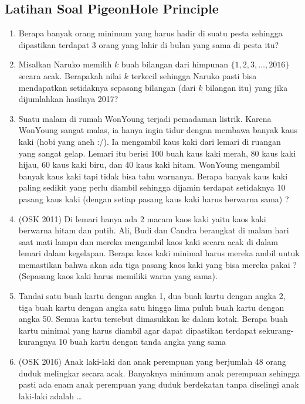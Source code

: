 \subsection{Latihan Soal PigeonHole Principle}
\begin{enumerate}
\item Berapa banyak orang minimum yang harus hadir di suatu pesta sehingga dipastikan terdapat 3 orang yang lahir di bulan yang sama di pesta itu?

\item Misalkan Naruko memilih $k$ buah bilangan dari himpunan $\{1,2,3,\dots,2016\}$ secara acak. Berapakah nilai $k$ terkecil sehingga Naruko pasti bisa mendapatkan setidaknya sepasang bilangan (dari $k$ bilangan itu) yang jika dijumlahkan hasilnya 2017?

\item Suatu malam di rumah WonYoung terjadi pemadaman listrik. Karena WonYoung sangat malas, ia hanya ingin tidur dengan membawa banyak kaus kaki (hobi yang aneh :/). Ia mengambil kaus kaki dari lemari di ruangan yang sangat gelap. Lemari itu berisi 100 buah kaus kaki merah, 80 kaus kaki hijau, 60 kaus kaki biru, dan 40 kaus kaki hitam. WonYoung mengambil banyak kaus kaki tapi tidak bisa tahu warnanya. Berapa banyak kaus kaki paling sedikit yang perlu diambil sehingga dijamin terdapat setidaknya 10 pasang kaus kaki (dengan setiap pasang kaus kaki harus berwarna sama) ?

\item (OSK 2011) Di lemari hanya ada 2 macam kaos kaki yaitu kaos kaki berwarna hitam dan putih. Ali, Budi dan Candra berangkat di malam hari saat mati lampu dan mereka mengambil kaos kaki secara acak di dalam lemari dalam kegelapan. Berapa kaos kaki minimal harus mereka ambil untuk memastikan bahwa akan ada tiga pasang kaos kaki yang bisa mereka pakai ? (Sepasang kaos kaki harus memiliki warna yang sama).
    
\item Tandai satu buah kartu dengan angka 1, dua buah kartu dengan angka 2, tiga buah kartu dengan angka satu hingga lima puluh buah kartu dengan angka 50. Semua kartu tersebut dimasukkan ke dalam kotak. Berapa buah kartu minimal yang harus diambil agar dapat dipastikan terdapat sekurang-kurangnya 10 buah kartu dengan tanda angka yang sama 

\item (OSK 2016) Anak laki-laki dan anak perempuan yang berjumlah 48 orang duduk melingkar secara acak. Banyaknya minimum anak perempuan sehingga pasti ada enam anak perempuan yang duduk berdekatan tanpa diselingi anak laki-laki adalah \dots
\end{enumerate}